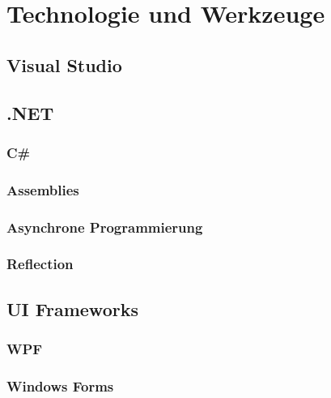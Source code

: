 \chapter{Technologie und Werkzeuge}
\label{cha:technologie_werkzeuge}

\section{Visual Studio}
\label{sec:visual_studio}

\section{.NET}
\label{sec:dotnet}

\subsection{C\#}
\label{subsec:csharp}

\subsection{Assemblies}
\label{subsec:assemblies}

\subsection{Asynchrone Programmierung}
\label{subsec:async}

\subsection{Reflection}
\label{subsec:reflection}

\section{UI Frameworks}
\label{sec:ui_frameworks}

\subsection{WPF}
\label{subsec:WPF}

\subsection{Windows Forms}
\label{subsec:Winforms}


